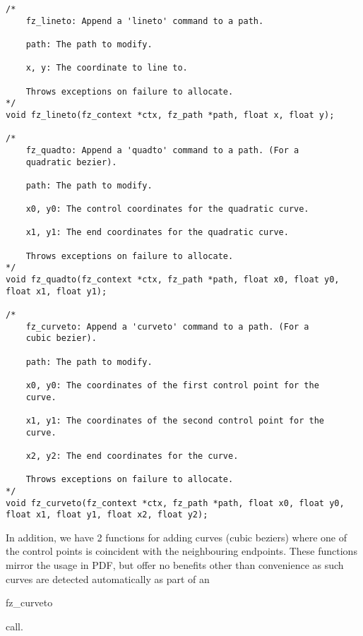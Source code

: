 \documentclass[oneside]{book}
\begin{document}
\begin{lstlisting}
/*
	fz_lineto: Append a 'lineto' command to a path.

	path: The path to modify.

	x, y: The coordinate to line to.

	Throws exceptions on failure to allocate.
*/
void fz_lineto(fz_context *ctx, fz_path *path, float x, float y);

/*
	fz_quadto: Append a 'quadto' command to a path. (For a
	quadratic bezier).

	path: The path to modify.

	x0, y0: The control coordinates for the quadratic curve.

	x1, y1: The end coordinates for the quadratic curve.

	Throws exceptions on failure to allocate.
*/
void fz_quadto(fz_context *ctx, fz_path *path, float x0, float y0, float x1, float y1);

/*
	fz_curveto: Append a 'curveto' command to a path. (For a
	cubic bezier).

	path: The path to modify.

	x0, y0: The coordinates of the first control point for the
	curve.

	x1, y1: The coordinates of the second control point for the
	curve.

	x2, y2: The end coordinates for the curve.

	Throws exceptions on failure to allocate.
*/
void fz_curveto(fz_context *ctx, fz_path *path, float x0, float y0, float x1, float y1, float x2, float y2);
\end{lstlisting}

In addition, we have 2 functions for adding curves (cubic beziers) where one of the control points is coincident with the neighbouring endpoints. These functions mirror the usage in PDF, but offer no benefits other than convenience as such curves are detected automatically as part of an \begin{tt}fz\_curveto\end{tt} call.
\end{document}
